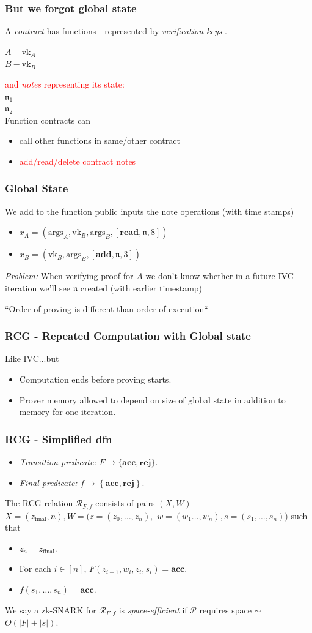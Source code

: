 \documentclass[shadesubsections,compress,14pt,mathserif]{beamer}
\newcommand{\set}[1]{\ensuremath{\left\{#1\right\}}}
\newcommand{\prv}{\ensuremath{\mathcal{P}}}
\newcommand{\acc}{{\mathbf{acc}}}
\newcommand{\rej}{{\mathbf{rej}}}
\newcommand{\nl}{\\ \pause \vspace{0.2in}}
\newcommand{\nlnp}{\\ \vspace{0.2in}}
\newcommand{\zfin}{\ensuremath{z_{\mathrm{final}}}}
\newcommand{\rel}{\ensuremath{\mathcal{R}}}
\newcommand{\vk}{\ensuremath{\mathrm{vk} }}
\newcommand{\add}{\ensuremath{\mathbf{add} }}
\renewcommand{\read}{\ensuremath{\mathbf{read} }}
\renewcommand{\note}{\ensuremath{\mathfrak{n} }}
\newcommand{\args}{\ensuremath{\mathrm{args} }}
\begin{document}
\begin{frame}
 \frametitle{ But we forgot global state }
A \emph{contract} has functions - represented by \emph{verification keys} .\nlnp

$A - \vk_A$\\
$B - \vk_B$\nl

{\textcolor{red}{and \emph{notes} representing its state:}}\\
$\note_1$\\
$\note_2$\nl
Function contracts can 
\begin{itemize}
 \item call other functions in same/other contract
 \item \textcolor{red}{add/read/delete contract notes}
 \end{itemize}
 \end{frame}
\begin{frame}
 \frametitle{Global State}
 We add to the function public inputs the  note operations (with time stamps)
 \begin{itemize}
\item $x_A=(\args_A,\vk_B,\args_B,[\read,\note,8])$
\item $x_B=(\vk_B,\args_B,[\add,\note,3])$\nl
\end{itemize} 
 \emph{Problem:} When verifying proof for $A$ we don't know whether in a future IVC iteration we'll see $\note$ created (with earlier timestamp)\nl
 
 
 {\selectfont ``Order of proving is different than order of execution``}
\end{frame}
\begin{frame}
 \frametitle{RCG - Repeated Computation with Global state}
 Like IVC...but\pause
 \begin{itemize}
  \item Computation ends before proving starts.\pause
  \item Prover memory allowed to depend on size of global state in addition to memory for one iteration.
 \end{itemize}

\end{frame}
\begin{frame}
 \frametitle{RCG - Simplified dfn}\pause
\noindent
\begin{itemize}
\item \emph{Transition predicate:} $F\to \{\acc,\rej\}$. 
\item \emph{Final predicate:} $f\to \set{\acc,\rej}$.\\
\end{itemize}
The RCG relation $\rel_{F,f}$ consists of pairs $(X,W)$ 
$X=(\zfin,n),W=(z=(z_0,\ldots,z_n),$ $w=(w_1\ldots,w_n),s=(s_1,\ldots,s_n))$ such that\pause
\begin{itemize}
 \item $z_n=\zfin$.\pause
 \item For each $i\in [n]$, $F(z_{i-1},w_i,z_i,s_i)=\acc$.\pause
 \item $f(s_1,\ldots,s_n)=\acc$.\pause
\end{itemize}


We say a zk-SNARK for $\rel_{F,f}$ is \emph{space-efficient} if $\prv$ requires space $\sim$ $O(|F|+|s|)$.
\end{frame}
\end{document}
